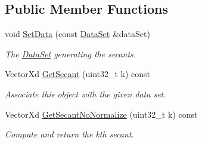 \subsection*{Public Member Functions}
\begin{DoxyCompactItemize}
\item 
\hypertarget{struct_d_r_d_s_p_1_1_secants_data_a1c1383e3f4eca99473eba63d7a50a024}{void \hyperlink{struct_d_r_d_s_p_1_1_secants_data_a1c1383e3f4eca99473eba63d7a50a024}{Set\-Data} (const \hyperlink{struct_d_r_d_s_p_1_1_data_set}{Data\-Set} \&data\-Set)}\label{struct_d_r_d_s_p_1_1_secants_data_a1c1383e3f4eca99473eba63d7a50a024}

\begin{DoxyCompactList}\small\item\em The \hyperlink{struct_d_r_d_s_p_1_1_data_set}{Data\-Set} generating the secants. \end{DoxyCompactList}\item 
\hypertarget{struct_d_r_d_s_p_1_1_secants_data_a7b94a05552fbbf08335ff1d4270ef13a}{Vector\-Xd \hyperlink{struct_d_r_d_s_p_1_1_secants_data_a7b94a05552fbbf08335ff1d4270ef13a}{Get\-Secant} (uint32\-\_\-t k) const }\label{struct_d_r_d_s_p_1_1_secants_data_a7b94a05552fbbf08335ff1d4270ef13a}

\begin{DoxyCompactList}\small\item\em Associate this object with the given data set. \end{DoxyCompactList}\item 
\hypertarget{struct_d_r_d_s_p_1_1_secants_data_a208053eededd620c2e32633aeb1ccb65}{Vector\-Xd \hyperlink{struct_d_r_d_s_p_1_1_secants_data_a208053eededd620c2e32633aeb1ccb65}{Get\-Secant\-No\-Normalize} (uint32\-\_\-t k) const }\label{struct_d_r_d_s_p_1_1_secants_data_a208053eededd620c2e32633aeb1ccb65}

\begin{DoxyCompactList}\small\item\em Compute and return the kth secant. \end{DoxyCompactList}\end{DoxyCompactItemize}
